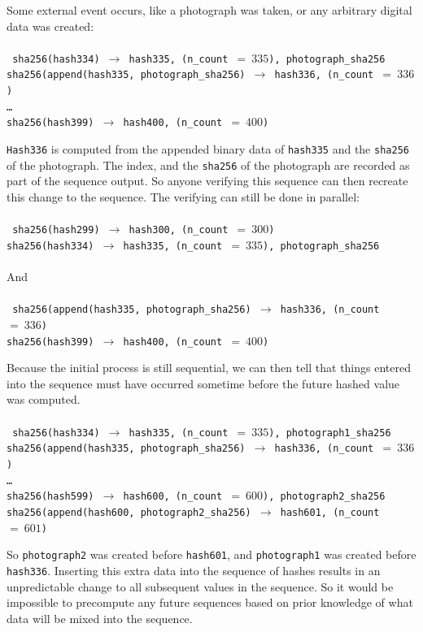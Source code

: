 \documentclass[12pt]{article}
\begin{document}
\noindent Some external event occurs, like a photograph was taken, or
any arbitrary digital data was created:\\\\\noindent
\texttt{
  sha256(hash334) $\rightarrow$ hash335, (n\_count $=~335$), photograph\_sha256\\
  sha256(append(hash335, photograph\_sha256) $\rightarrow$ hash336,
  (n\_count $=~336$)\\
  \ldots\\
  sha256(hash399) $\rightarrow$ hash400, (n\_count $=~400$)\\
}

\texttt{Hash336} is computed from the appended binary data of
\texttt{hash335} and the \texttt{sha256} of the photograph. The index,
and the \texttt{sha256} of the photograph are recorded as part of the
sequence output. So anyone verifying this sequence can then recreate
this change to the sequence. The verifying can still be done in
parallel:\\\\\noindent
\texttt{
  sha256(hash299) $\rightarrow$ hash300, (n\_count $=~300$)\\
  sha256(hash334) $\rightarrow$ hash335, (n\_count $=~335$), photograph\_sha256\\
}\\\noindent
And\\\\\noindent
\texttt{
  sha256(append(hash335, photograph\_sha256) $\rightarrow$ hash336,
  (n\_count $=~336$)\\
  sha256(hash399) $\rightarrow$ hash400, (n\_count $=~400$)\\
}

Because the initial process is still sequential, we can then tell that things entered into the sequence must have occurred sometime before the future hashed value was computed.\\\\\noindent
\texttt{
sha256(hash334) $\rightarrow$ hash335, (n\_count $=~335$), photograph1\_sha256\\
sha256(append(hash335, photograph\_sha256) $\rightarrow$ hash336,
(n\_count $=~336$)\\
\ldots\\
sha256(hash599) $\rightarrow$ hash600, (n\_count $=~600$), photograph2\_sha256
sha256(append(hash600, photograph2\_sha256) $\rightarrow$ hash601,
(n\_count $=~601$)\\
}

So \texttt{photograph2} was created before \texttt{hash601}, and
\texttt{photograph1} was created before \texttt{hash336}. Inserting this extra data into the sequence of hashes results in an unpredictable change to all subsequent values in the sequence. So it would be impossible to precompute any future sequences based on prior knowledge of what data will be mixed into the sequence.\\
\end{document}
